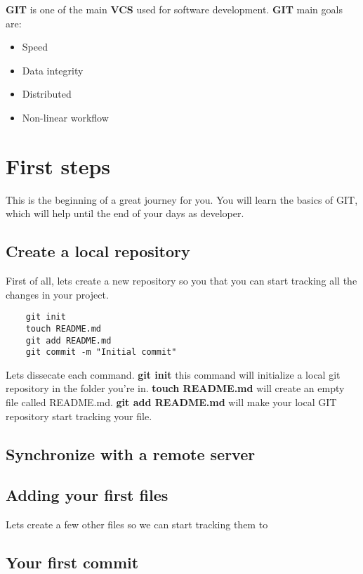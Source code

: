 \documentclass{article}
\begin{document}
\textbf{GIT} is one of the main \textbf{VCS} used for software development. \textbf{GIT} main goals are:

\begin{itemize}
\item{Speed}
\item{Data integrity}
\item{Distributed}
\item{Non-linear workflow}
\end{itemize}

\clearpage

\section{First steps}

This is the beginning of a great journey for you. You will learn the basics of GIT, which will help until the end of your days as developer.

\subsection{Create a local repository}

First of all, lets create a new repository so you that you can start tracking all the changes in your project.

\begin{lstlisting}
	git init
	touch README.md
	git add README.md
	git commit -m "Initial commit"
\end{lstlisting}

Lets dissecate each command. \textbf{git init} this command will initialize a local git repository in the folder you're in. \textbf{touch README.md} will create an empty file called README.md. \textbf{git add README.md} will make your local GIT repository start tracking your file.

\subsection{Synchronize with a remote server}


\subsection{Adding your first files}

Lets create a few other files so we can start tracking them to

\subsection{Your first commit}
\end{document}
